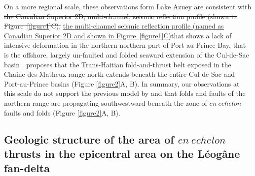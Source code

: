 \documentclass[linenumbers,draft]{agujournal}
\providecommand{\DIFadd}[1]{{\protect\color{blue}\uwave{#1}}} %
\providecommand{\DIFdel}[1]{{\protect\color{red}\sout{#1}}}                      %
\providecommand{\DIFaddbegin}{} %
\providecommand{\DIFaddend}{} %
\providecommand{\DIFdelbegin}{} %
\providecommand{\DIFdelend}{} %
\begin{document}

On a more regional scale, these observations form Lake Azuey are consistent with \DIFdelbegin \DIFdel{the Canadian Superior 2D, multi-channel, seismic reflection profile (shown in Figure~\ref{figure1}C), }\DIFdelend \DIFaddbegin \ul{the multi-channel seismic reflection profile (named as Canadian Superior 2D and shown in Figure~{\ref{figure1}}C)}\DIFadd{, }\DIFaddend that shows a lack of intensive deformation in the \DIFdelbegin \DIFdel{northern }\DIFdelend \DIFaddbegin \st{northern} \DIFaddend part of Port-au-Prince Bay, that is the offshore, largely un-faulted and folded seaward extension of the Cul-de-Sac basin \citep{mchugh2011offshore}. \citet{pubellier2000plate} proposes that the Trans-Haitian fold-and-thrust belt exposed in the Chaine des Matheux range north extends beneath the entire Cul-de-Sac and Port-au-Prince basins (Figure \ref{figure2}A, B). In summary, our observations at this scale do not support the previous model by \citet{pubellier2000plate} and \citet{calais2010transpressional} that folds and faults of the northern range are propagating southwestward beneath the zone of $en~echelon$ faults and folds (Figure \ref{figure2}A, B).

\subsection{Geologic structure of the area of $en~echelon$ thrusts in the epicentral area on the L\'eog\^ane fan-delta}
\end{document}
